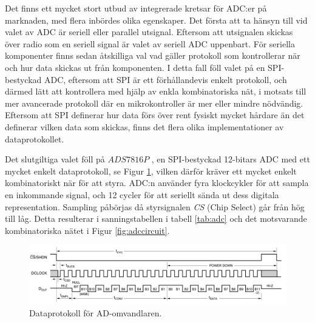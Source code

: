 \documentclass[a4paper,10pt]{article}
\begin{document}
Det finns ett mycket stort utbud av integrerade kretsar för ADC:er på marknaden,
med flera inbördes olika egenskaper. Det första att ta hänsyn till vid valet av
ADC är seriell eller parallel utsignal. Eftersom att utsignalen skickas över 
radio som en seriell signal är valet av seriell ADC uppenbart. För seriella 
komponenter finns sedan åtskilliga val vad gäller protokoll som kontrollerar när
och hur data skickas ut från komponenten. I detta fall föll valet på en 
SPI-bestyckad ADC, eftersom att SPI är ett förhållandevis enkelt protokoll, och
därmed lätt att kontrollera med hjälp av enkla kombinatoriska nät, i motsats 
till mer avancerade protokoll där en mikrokontroller är mer eller mindre
nödvändig. Eftersom att SPI definerar hur data förs över rent fysiskt mycket
hårdare än det definerar vilken data som skickas, finns det flera olika 
implementationer av dataprotokollet.

Det slutgiltiga valet föll på $ADS7816P$ \cite{adc}, en SPI-bestyckad 12-bitars ADC med ett mycket enkelt dataprotokoll, 
se Figur \ref{fig:adcproto}, vilken därför kräver ett mycket enkelt 
kombinatoriskt när för att styra. ADC:n använder fyra klockcykler för att sampla en inkommande signal, och 12 cycler för att
seriellt sända ut dess digitala representation. Sampling påbörjas då styrsignalen \emph{CS} (Chip Select) går från hög till låg.
Detta resulterar i sanningstabellen i tabell \ref{tab:adc} och det motsvarande kombinatoriska nätet i Figur 
\ref{fig:adccircuit}.

\begin{figure}
\centering
\includegraphics[width=\textwidth]{adcdiagram.png}
\caption{Dataprotokoll för AD-omvandlaren.}
\label{fig:adcproto}
\end{figure}
\end{document}

